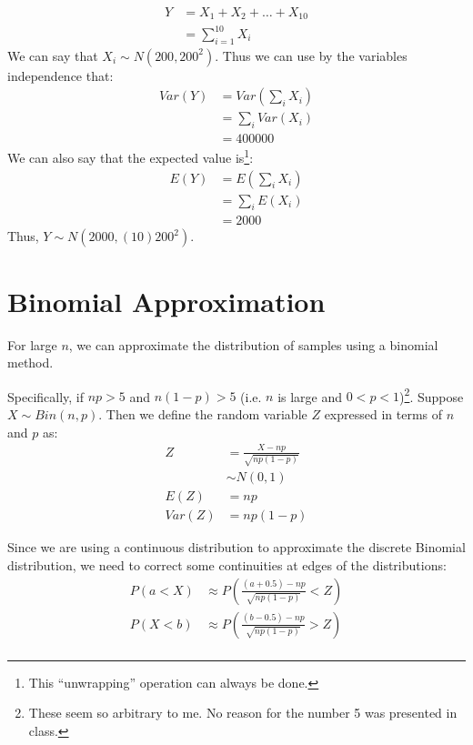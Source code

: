                 \begin{align*}
                    Y &= X_1 + X_2 + \ldots + X_10 \\
                    &= \sum_{i=1}^{10} X_i
                \end{align*}
                We can say that $X_i \sim N(200, 200^2)$.
                Thus we can use by the variables independence that:
                \begin{align*}
                    Var(Y) &= Var\left(\sum_i X_i\right) \\
                    &= \sum_i Var(X_i) \\
                    &= 400 000
                \end{align*}
                We can also say that the expected value is\footnote{This ``unwrapping'' operation can always be done.}:
                \begin{align*}
                    E(Y) &= E\left(\sum_i X_i\right) \\
                    &= \sum_i E(X_i) \\
                    &= 2000
                \end{align*}
                Thus, $Y \sim N(2000, (10) 200^2)$.
            \section{Binomial Approximation} %
            \label{sec:binomial_approximation}
                For large $n$, we can approximate the distribution of samples using a binomial method.

                Specifically, if $np > 5$ and $n (1 - p) > 5$ (i.e. $n$ is large and $0 < p < 1$)\footnote{These seem so arbitrary to me. No reason for the number 5 was presented in class.}.
                Suppose $X \sim Bin(n, p)$.
                Then we define the random variable $Z$ expressed in terms of $n$ and $p$ as:
                \begin{align*}
                    Z &= \frac{X - np}{\sqrt{np (1 - p)}} \\
                    &\sim N(0, 1) \\
                    E(Z) &= np \\
                    Var(Z) &= np(1-p)
                \end{align*}

                Since we are using a continuous distribution to approximate the discrete Binomial distribution, we need to correct some continuities at edges of the distributions:
                \begin{align*}
                    P(a < X) &\approx P\left( \frac{(a + 0.5) - np}{\sqrt{np(1 - p)}} < Z \right) \\
                    P(X < b) &\approx P\left( \frac{(b - 0.5) - np}{\sqrt{np(1 - p)}} > Z \right) \\
                \end{align*}
